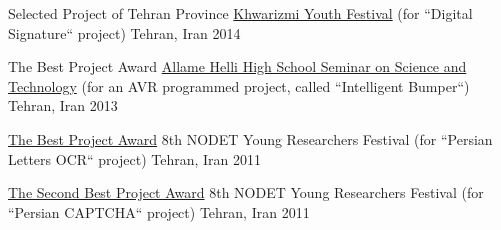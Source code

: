 

\begin{cvhonors}

  \cvhonor
    {Selected Project of Tehran Province} %
    {\href{http://khwarizmi.ir/fkia/}{Khwarizmi Youth Festival} (for ``Digital Signature`` project)} %
    {Tehran, Iran} %
    {2014} %

  \cvhonor
    {The Best Project Award} %
    {\href{https://www.helli.ir/portal/seminar}{Allame Helli High School Seminar on Science and Technology} (for an AVR programmed project, called ``Intelligent Bumper``)} %
    {Tehran, Iran} %
    {2013} %

  \cvhonor
    {\href{https://www.helli.ir/portal/content/\%D8\%AA\%D9\%82\%D8\%AF\%DB\%8C\%D8\%B1-\%D8\%A7\%D8\%B2-\%D8\%AF\%D8\%A7\%D9\%86\%D8\%B4-\%D8\%A2\%D9\%85\%D9\%88\%D8\%B2\%D8\%A7\%D9\%86-\%D8\%A8\%D8\%B1\%D8\%AA\%D8\%B1\%D9\%BE\%DA\%98\%D9\%88\%D9\%87\%D8\%B4\%DA\%AF\%D8\%B1}{The Best Project Award}} %
    {8th NODET Young Researchers Festival (for ``Persian Letters OCR`` project)} %
    {Tehran, Iran} %
    {2011} %

  \cvhonor
    {\href{https://www.helli.ir/portal/content/\%D8\%AA\%D9\%82\%D8\%AF\%DB\%8C\%D8\%B1-\%D8\%A7\%D8\%B2-\%D8\%AF\%D8\%A7\%D9\%86\%D8\%B4-\%D8\%A2\%D9\%85\%D9\%88\%D8\%B2\%D8\%A7\%D9\%86-\%D8\%A8\%D8\%B1\%D8\%AA\%D8\%B1\%D9\%BE\%DA\%98\%D9\%88\%D9\%87\%D8\%B4\%DA\%AF\%D8\%B1}{The Second Best Project Award}} %
    {8th NODET Young Researchers Festival (for ``Persian CAPTCHA`` project)} %
    {Tehran, Iran} %
    {2011} %




\end{cvhonors}



